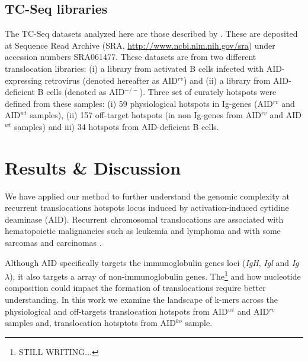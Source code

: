 \documentclass{bioinfo}
\begin{document}
\subsection{TC-Seq libraries}\label{methods:tcseqhs}
The TC-Seq datasets analyzed here are those described by
\cite{pmid21962510}. These are deposited at Sequence Read Archive
(SRA, \url{http://www.ncbi.nlm.nih.gov/sra}) under accession numbers 
SRA061477. These datasets are from two different translocation
libraries: (i) a library from activated B cells infected with
AID-expressing retrovirus (denoted hereafter as AID$^{rv}$) and (ii) a
library from AID-deficient B cells (denoted as AID$^{-/-}$). Three set
of curately hotspots were defined from these samples: (i) 59
physiological hotspots in Ig-genes (AID$^{rv}$ and  AID$^{wt}$
samples), (ii) 157 off-target hotspots (in non Ig-genes from
AID$^{rv}$ and  AID$^{wt}$ samples) and iii) 34 hotspots from
AID-deficient B cells. 


\section{Results \& Discussion}

We have applied our method to further understand the genomic
complexity at recurrent translocations hotspots locus induced by
activation-induced cytidine deaminase (AID). Recurrent chromosomal
translocations are associated with hematopoietic malignancies such as
leukemia and lymphoma and with some sarcomas and
carcinomas \cite{pmid20371343}.


Although AID specifically targets the immunoglobulin genes loci (\emph{IgH},
\emph{Igl} and \emph{Ig}$\lambda$), it also targets a array of non-immunoglobulin
genes. The\footnote{STILL WRITING...} and how nucleotide composition could impact the formation of
translocations require better understanding. In this work we examine
the landscape of k-mers across the physiological and off-targets
translocation hotspots from AID$^{wt}$ and AID$^{rv}$ samples and,
translocation hotsptots from AID$^{ko}$ sample.
\end{document}
